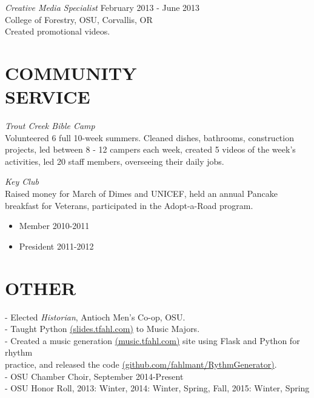 \documentclass[line,margin]{res}
\begin{document}
\begin{resume}
                    {\sl Creative Media Specialist} \hfill February 2013 - June 2013 \\
                    College of Forestry, OSU,
                    Corvallis, OR\\
                    Created promotional videos.
 
\section{COMMUNITY \\ SERVICE}  
                {\sl Trout Creek Bible Camp\\}
                    Volunteered 6 full 10-week summers.
                    Cleaned dishes, bathrooms, construction projects,
                    led between 8 - 12 campers each week,
                    created 5 videos of the week's activities,
                    led 20 staff members, overseeing their daily jobs.

                {\sl Key Club\\}
                    Raised money for March of Dimes and UNICEF, held an annual Pancake breakfast
                    for Veterans, participated in the Adopt-a-Road program.
                    \begin{itemize}  \itemsep -2pt %
                        \item Member 2010-2011
                        \item President 2011-2012
                    \end{itemize}

\section{OTHER\\}             
                - Elected {\it Historian}, Antioch Men's Co-op, OSU. \\
                - Taught Python \href{http://slides.tfahl.com/python-lessons/}{(slides.tfahl.com)} to Music Majors. \\
                - Created a music generation \href{http://music.tfahl.com}{(music.tfahl.com)} 
                      site using Flask and Python for rhythm\\ 
                      practice, and released the code 
                      \href{https://github.com/fahlmant/RhythmGenerator}{(github.com/fahlmant/RythmGenerator)}.\\
                - OSU Chamber Choir, September 2014-Present\\
                - OSU Honor Roll, 2013: Winter, 2014: Winter, Spring, Fall, 2015: Winter, Spring\\

\end{resume}
\end{document}
